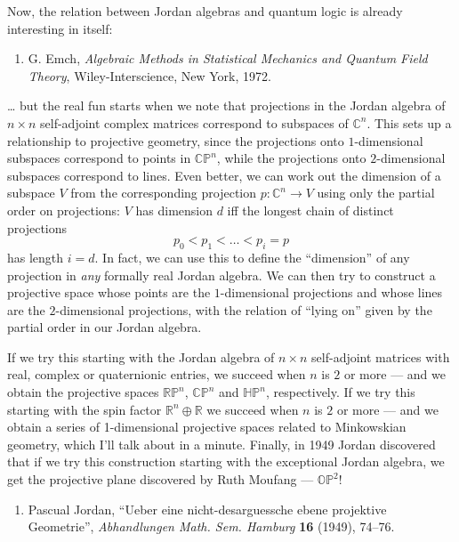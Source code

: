 \documentclass{article}
\def\tightlist{}
\begin{document}
Now, the relation between Jordan algebras and quantum logic is already
interesting in itself:

\begin{enumerate}
\def\labelenumi{\arabic{enumi})}
\setcounter{enumi}{7}
\tightlist
\item
  G. Emch, \emph{Algebraic Methods in Statistical Mechanics and Quantum
  Field Theory}, Wiley-Interscience, New York, 1972.
\end{enumerate}

\ldots{} but the real fun starts when we note that projections in the
Jordan algebra of \(n\times n\) self-adjoint complex matrices correspond
to subspaces of \(\mathbb{C}^n\). This sets up a relationship to
projective geometry, since the projections onto \(1\)-dimensional
subspaces correspond to points in \(\mathbb{CP}^n\), while the
projections onto \(2\)-dimensional subspaces correspond to lines. Even
better, we can work out the dimension of a subspace \(V\) from the
corresponding projection \(p\colon\mathbb{C}^n\to V\) using only the
partial order on projections: \(V\) has dimension \(d\) iff the longest
chain of distinct projections \[p_0 < p_1 < \ldots < p_i = p\] has
length \(i = d\). In fact, we can use this to define the ``dimension''
of any projection in \emph{any} formally real Jordan algebra. We can
then try to construct a projective space whose points are the
\(1\)-dimensional projections and whose lines are the \(2\)-dimensional
projections, with the relation of ``lying on'' given by the partial
order in our Jordan algebra.

If we try this starting with the Jordan algebra of \(n\times n\)
self-adjoint matrices with real, complex or quaternionic entries, we
succeed when \(n\) is \(2\) or more --- and we obtain the projective
spaces \(\mathbb{RP}^n\), \(\mathbb{CP}^n\) and \(\mathbb{HP}^n\),
respectively. If we try this starting with the spin factor
\(\mathbb{R}^n\oplus\mathbb{R}\) we succeed when \(n\) is \(2\) or more
--- and we obtain a series of 1-dimensional projective spaces related to
Minkowskian geometry, which I'll talk about in a minute. Finally, in
1949 Jordan discovered that if we try this construction starting with
the exceptional Jordan algebra, we get the projective plane discovered
by Ruth Moufang --- \(\mathbb{OP}^2\)!

\begin{enumerate}
\def\labelenumi{\arabic{enumi})}
\setcounter{enumi}{8}
\tightlist
\item
  Pascual Jordan, ``Ueber eine nicht-desarguessche ebene projektive
  Geometrie'', \emph{Abhandlungen Math. Sem. Hamburg} \textbf{16}
  (1949), 74--76.
\end{enumerate}
\end{document}

